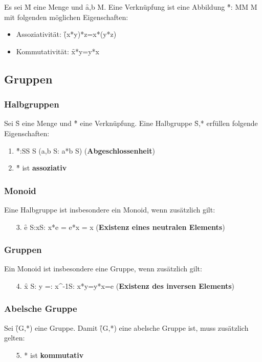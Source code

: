 Es sei \f{M} eine Menge und \f{a,b \in M}. Eine Verknüpfung ist eine Abbildung \f{*: M\times M \rightarrow M} mit folgenden möglichen Eigenschaften:
\begin{itemize}
    \item Assoziativität: \f{(x*y)*z=x*(y*z)}
    \item Kommutativität: \f{x*y=y*x}
\end{itemize}



\subsection{Gruppen}
\subsubsection*{Halbgruppen}
Sei \f{S} eine Menge und \f{*} eine Verknüpfung. Eine Halbgruppe \f{S,*} erfüllen folgende Eigenschaften:
\begin{enumerate}
    \item \f{*:S\times S \rightarrow S \quad (\forall a,b \in S: a*b \in S)\quad} (\textbf{Abgeschlossenheit})
    \item \f{*} ist \textbf{assoziativ}
\end{enumerate}
\subsubsection*{Monoid}
Eine Halbgruppe ist insbesondere ein Monoid, wenn zusätzlich gilt:
\begin{enumerate}
    \item[3.] \f{\exists e \in S:\forall x\in S: x*e = e*x = x\quad} (\textbf{Existenz eines neutralen Elements})
\end{enumerate}
\subsubsection*{Gruppen}
Ein Monoid ist insbesondere eine Gruppe, wenn zusätzlich gilt:
\begin{enumerate}
    \item[4.] \f{\forall x \in S: \exists y =: x^{-1}\in S: x*y=y*x=e\quad} (\textbf{Existenz des inversen Elements}) 
\end{enumerate}
\subsubsection*{Abelsche Gruppe}
Sei \f{(G,*)} eine Gruppe. Damit \f{(G,*)} eine abelsche Gruppe ist, muss zusätzlich gelten:
\begin{enumerate}
    \item[5.] * ist \textbf{kommutativ} 
\end{enumerate}
